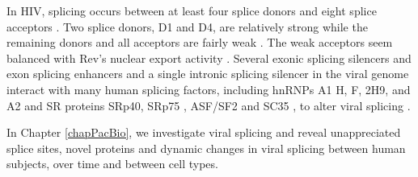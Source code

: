 \documentclass[../sherrill-Mix_thesis.tex]{subfiles}
\begin{document}
	 In HIV, splicing occurs between at least four splice donors and eight splice acceptors \citep{Stoltzfus2009}. Two splice donors, D1 and D4, are relatively strong while the remaining donors and all acceptors are fairly weak \citep{O'Reilly1995}. The weak acceptors seem balanced with Rev's nuclear export activity \citep{Kammler2006}. Several exonic splicing silencers \citep{Amendt1994,Levengood2012} and exon splicing enhancers \citep{Caputi2004,Asang2008} and a single intronic splicing silencer \citep{Tange2001} in the viral genome interact with many human splicing factors, including hnRNPs A1 \citep{Tange2001, Levengood2012} H, F, 2H9, and A2 \citep{Jablonski2008} and SR proteins SRp40\citep{Caputi2004,Tranell2010}, SRp75 \citep{Tranell2010}, ASF/SF2 \citep{Caputi2004} and SC35 \citep{Jablonski2008}, to alter viral splicing \citep{Stoltzfus2006,Stoltzfus2009}.

	 In Chapter \ref{chapPacBio}, we investigate viral splicing and reveal unappreciated splice sites, novel proteins and dynamic changes in viral splicing between human subjects, over time and between cell types.








\end{document}
